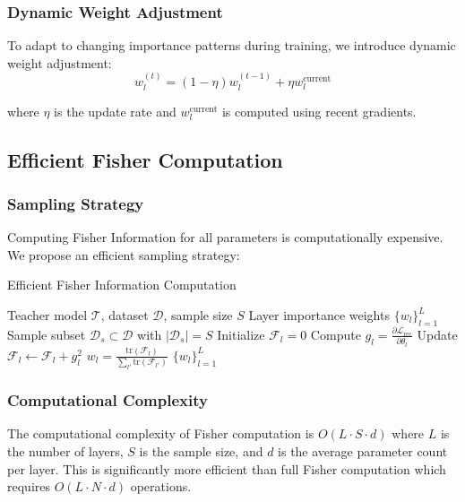 \documentclass[10pt,conference]{IEEEtran}
\newcommand{\fisher}{\mathcal{F}}
\newcommand{\loss}{\mathcal{L}}
\newcommand{\teacher}{\mathcal{T}}
\begin{document}
\subsubsection{Dynamic Weight Adjustment}

To adapt to changing importance patterns during training, we introduce dynamic weight adjustment:
\begin{equation}
w_l^{(t)} = (1-\eta) w_l^{(t-1)} + \eta w_l^{\text{current}}
\end{equation}

where $\eta$ is the update rate and $w_l^{\text{current}}$ is computed using recent gradients.

\subsection{Efficient Fisher Computation}

\subsubsection{Sampling Strategy}

Computing Fisher Information for all parameters is computationally expensive. We propose an efficient sampling strategy:

\begin{algorithm}[t]
\caption{Efficient Fisher Information Computation}
\label{alg:fisher_computation}
\begin{algorithmic}[1]
\REQUIRE Teacher model $\teacher$, dataset $\mathcal{D}$, sample size $S$
\ENSURE Layer importance weights $\{w_l\}_{l=1}^L$
\STATE Sample subset $\mathcal{D}_s \subset \mathcal{D}$ with $|\mathcal{D}_s| = S$
    \STATE Initialize $\fisher_l = 0$
        \STATE Compute $g_l = \frac{\partial \loss_{\text{rec}}}{\partial \theta_l}$
        \STATE Update $\fisher_l \leftarrow \fisher_l + g_l^2$
    \ENDFOR
    \STATE $w_l = \frac{\text{tr}(\fisher_l)}{\sum_{l'} \text{tr}(\fisher_{l'})}$
\ENDFOR
\RETURN $\{w_l\}_{l=1}^L$
\end{algorithmic}
\end{algorithm}

\subsubsection{Computational Complexity}

The computational complexity of Fisher computation is $O(L \cdot S \cdot d)$ where $L$ is the number of layers, $S$ is the sample size, and $d$ is the average parameter count per layer. This is significantly more efficient than full Fisher computation which requires $O(L \cdot N \cdot d)$ operations.
\end{document}
